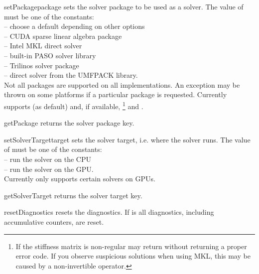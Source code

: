 \begin{methoddesc}[SolverOptions]{setPackage}{package}
sets the solver package to be used as a solver.
The value of  must be one of the constants:\\
  -- choose a default depending on other options\\
  -- CUDA sparse linear algebra package\\
  -- Intel MKL direct solver\\
  -- built-in PASO solver library\\
  -- Trilinos solver package\\
  -- direct solver from the UMFPACK library.\\
Not all packages are supported on all implementations. An exception may be
thrown on some platforms if a particular package is requested.
Currently \finley supports  (as default) and, if
available, \footnote{If the stiffness matrix is
non-regular \MKL may return without returning a proper error code.
If you observe suspicious solutions when using MKL, this may be caused by a
non-invertible operator.} and .
\end{methoddesc}

\begin{methoddesc}[SolverOptions]{getPackage}{}
returns the solver package key.
\end{methoddesc}

\begin{methoddesc}[SolverOptions]{setSolverTarget}{target}
sets the solver target, i.e. where the solver runs.
The value of  must be one of the constants:\\
  -- run the solver on the CPU\\
  -- run the solver on the GPU.\\
Currently only \ripley supports certain solvers on GPUs.
\end{methoddesc}

\begin{methoddesc}[SolverOptions]{getSolverTarget}{}
returns the solver target key.
\end{methoddesc}

\begin{methoddesc}[SolverOptions]{resetDiagnostics}{}
resets the diagnostics. If  is \True all diagnostics, including
accumulative counters, are reset.
\end{methoddesc}

